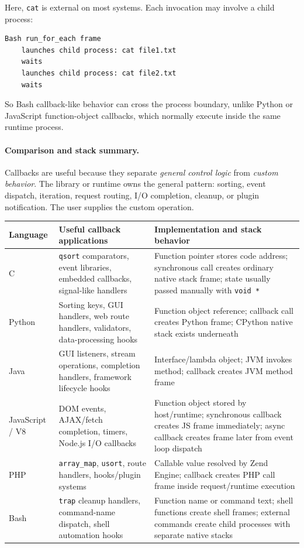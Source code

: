 Here, \texttt{cat} is external on most systems. Each invocation may involve a child process:

\begin{verbatim}
Bash run_for_each frame
    launches child process: cat file1.txt
    waits
    launches child process: cat file2.txt
    waits
\end{verbatim}

So Bash callback-like behavior can cross the process boundary, unlike Python or JavaScript function-object callbacks, which normally execute inside the same runtime process.

\paragraph{Comparison and stack summary.}

Callbacks are useful because they separate \emph{general control logic} from \emph{custom behavior}. The library or runtime owns the general pattern: sorting, event dispatch, iteration, request routing, I/O completion, cleanup, or plugin notification. The user supplies the custom operation.

\begin{center}
\begin{tabular}{|p{}|p{}|p{}|}
\hline
\textbf{Language} & \textbf{Useful callback applications} & \textbf{Implementation and stack behavior} \\
\hline
C & \texttt{qsort} comparators, event libraries, embedded callbacks, signal-like handlers & Function pointer stores code address; synchronous call creates ordinary native stack frame; state usually passed manually with \texttt{void *} \\
\hline
Python & Sorting keys, GUI handlers, web route handlers, validators, data-processing hooks & Function object reference; callback call creates Python frame; CPython native stack exists underneath \\
\hline
Java & GUI listeners, stream operations, completion handlers, framework lifecycle hooks & Interface/lambda object; JVM invokes method; callback creates JVM method frame \\
\hline
JavaScript / V8 & DOM events, AJAX/fetch completion, timers, Node.js I/O callbacks & Function object stored by host/runtime; synchronous callback creates JS frame immediately; async callback creates frame later from event loop dispatch \\
\hline
PHP & \texttt{array\_map}, \texttt{usort}, route handlers, hooks/plugin systems & Callable value resolved by Zend Engine; callback creates PHP call frame inside request/runtime execution \\
\hline
Bash & \texttt{trap} cleanup handlers, command-name dispatch, shell automation hooks & Function name or command text; shell functions create shell frames; external commands create child processes with separate native stacks \\
\hline
\end{tabular}
\end{center}


